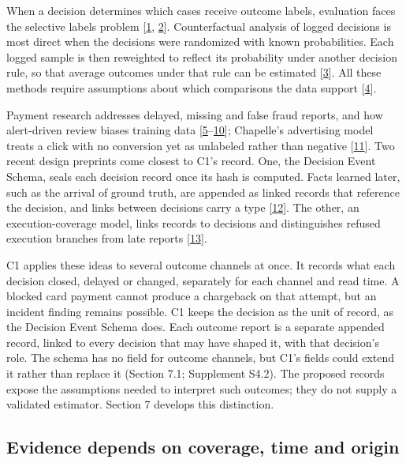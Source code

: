 \documentclass[acmlarge,nonacm]{acmart}
\begin{document}
When a decision determines which cases receive outcome labels,
evaluation faces the selective labels problem
{[}\protect\hyperlink{ref-Lakkaraju2017Selective}{1},
\protect\hyperlink{ref-Kilbertus2020Fair}{2}{]}. Counterfactual analysis
of logged decisions is most direct when the decisions were randomized
with known probabilities. Each logged sample is then reweighted to
reflect its probability under another decision rule, so that average
outcomes under that rule can be estimated
{[}\protect\hyperlink{ref-Bottou2013Counterfactual}{3}{]}. All these
methods require assumptions about which comparisons the data support
{[}\protect\hyperlink{ref-HernanRobins2020}{4}{]}.

Payment research addresses delayed, missing and false fraud reports, and
how alert-driven review biases training data
{[}\protect\hyperlink{ref-Cao2019TitAnt}{5}--\protect\hyperlink{ref-HeLoh2026Grab}{10}{]};
Chapelle's advertising model treats a click with no conversion yet as
unlabeled rather than negative
{[}\protect\hyperlink{ref-Chapelle2014Delayed}{11}{]}. Two recent design
preprints come closest to C1's record. One, the Decision Event Schema,
seals each decision record once its hash is computed. Facts learned
later, such as the arrival of ground truth, are appended as linked
records that reference the decision, and links between decisions carry a
type {[}\protect\hyperlink{ref-Solozobov2026DecisionTrace}{12}{]}. The
other, an execution-coverage model, links records to decisions and
distinguishes refused execution branches from late reports
{[}\protect\hyperlink{ref-Wu2026EvidenceCoverage}{13}{]}.

C1 applies these ideas to several outcome channels at once. It records
what each decision closed, delayed or changed, separately for each
channel and read time. A blocked card payment cannot produce a
chargeback on that attempt, but an incident finding remains possible. C1
keeps the decision as the unit of record, as the Decision Event Schema
does. Each outcome report is a separate appended record, linked to every
decision that may have shaped it, with that decision's role. The schema
has no field for outcome channels, but C1's fields could extend it
rather than replace it (Section 7.1; Supplement S4.2). The proposed
records expose the assumptions needed to interpret such outcomes; they
do not supply a validated estimator. Section 7 develops this
distinction.

\hypertarget{evidence-depends-on-coverage-time-and-origin}{%
\subsection{Evidence depends on coverage, time and
origin}\label{evidence-depends-on-coverage-time-and-origin}}
\end{document}
